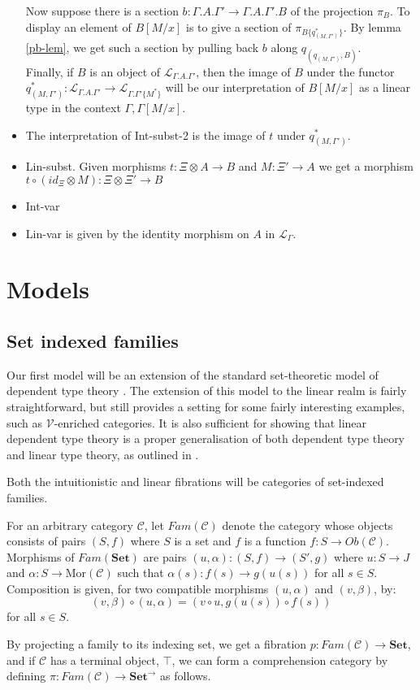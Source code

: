 \begin{itemize}
Now suppose there is a section $b : \Gamma.A.\Gamma' \to \Gamma.A.\Gamma'.B$ of the projection $\pi_B$. To display an element of $B[M/x]$ is to give a section of $\pi_{B\{q^*_{(M,\Gamma')}\}}$. By lemma \ref{pb-lem}, we get such a section by pulling back $b$ along $q_{(q_{(M, \Gamma')},B)}$.
\\
Finally, if $B$ is an object of $\mathcal{L}_{\Gamma.A.\Gamma'}$, then the image of $B$ under the functor $q_{(M, \Gamma')}^* : \mathcal{L}_{\Gamma.A.\Gamma'} \to \mathcal{L}_{\Gamma.\Gamma'\{M^*\}}$ will be our interpretation of $B[M/x]$ as a linear type in the context $\Gamma,\Gamma[M/x]$.
\item The interpretation of Int-subst-2 is the image of $t$ under $q_{(M, \Gamma')}^*$.
\item Lin-subst. Given morphisms $t : \Xi \otimes A \to B$ and $M : \Xi' \to A$ we get a morphism $t \circ (id_\Xi \otimes M) : \Xi \otimes \Xi' \to B$
\item Int-var 
\item Lin-var is given by the identity morphism on $A$ in $\mathcal{L}_{\Gamma}$.
\end{itemize}
\newpage
\section{Models}
\subsection{Set indexed families}
Our first model will be an extension of the standard set-theoretic model of dependent type theory \cite{hofmann1997syntax}. The extension of this model to the linear realm is fairly straightforward, but still provides a setting for some fairly interesting examples, such as $\mathcal{V}$-enriched categories. It is also sufficient for showing that linear dependent type theory is a proper generalisation of both dependent type theory and linear type theory, as outlined in \cite{vakar14}. 


Both the intuitionistic and linear fibrations will be categories of set-indexed families.
\begin{defn}
For an arbitrary category $\mathcal{C}$, let $Fam(\mathcal{C})$ denote the category whose objects consists of pairs $(S, f)$ where $S$ is a set and $f$ is a function $f : S \to Ob(\mathcal{C})$. Morphisms of $Fam(\mathbf{Set})$ are pairs $(u, \alpha) : (S, f) \to (S', g)$ where $u : S \to J$ and $\alpha : S \to \text{Mor}(\mathcal{C})$ such that $\alpha(s) : f(s) \to g(u(s))$ for all $s \in S$. Composition is given, for two compatible morphisms $(u, \alpha)$ and $(v, \beta)$, by:
\[
(v, \beta) \circ (u, \alpha) = (v \circ u, g(u(s)) \circ f(s))
\]
for all $s \in S$.
\end{defn}
By projecting a family to its indexing set, we get a fibration $p : Fam(\mathcal{C}) \to \mathbf{Set}$, and if $\mathcal{C}$ has a terminal object, $\top$, we can form a comprehension category by defining $\pi : Fam(\mathcal{C}) \to \mathbf{Set}^\to$ as follows.

